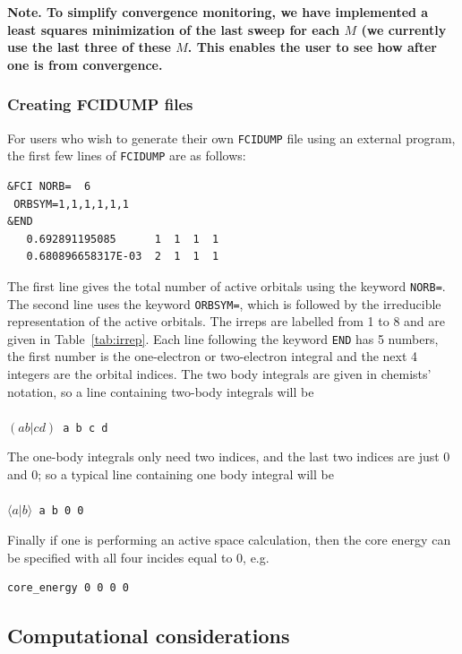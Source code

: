 \documentclass[letterpaper,12pt,aps, pra]{revtex4-1}
\begin{document}
{\bf Note.  To simplify convergence monitoring, we have implemented a least
squares minimization of the last sweep for each $M$ (we currently use the last
three of these $M$. This enables the user to see how after one is from
convergence.}

\subsubsection{Creating FCIDUMP files}\label{sec:appFCIDUMP}
For users who wish to generate their own \texttt{FCIDUMP} file using an external program, the first few lines of \texttt{FCIDUMP} are as follows:
\begin{verbatim}
&FCI NORB=  6
 ORBSYM=1,1,1,1,1,1
&END
   0.692891195085      1  1  1  1
   0.680896658317E-03  2  1  1  1
\end{verbatim}
The first line gives the total number of active orbitals using the keyword \texttt{NORB=}. The second line uses the keyword \texttt{ORBSYM=}, which is followed by the irreducible representation of the active orbitals. The irreps are labelled from 1 to 8 and are given in Table~\ref{tab:irrep}.
Each line following the keyword \texttt{END} has 5 numbers, the first number is the one-electron or two-electron integral and the next 4 integers are the orbital indices. The two body integrals are given in chemists' notation, so a line containing two-body integrals will be\\
\texttt{
\\$( a b|cd)$ a b c d\\}
 
The one-body integrals only need two indices, and the last two indices are just 0 and 0; so a typical line containing one body integral will be\\
\texttt{
\\$\langle a|b\rangle$ a b 0 0\\}

Finally if one is performing an active space calculation, then the core energy can be specified with all four incides equal to 0, e.g.
\begin{verbatim}
core_energy 0 0 0 0
\end{verbatim}

\subsection{Computational considerations}\label{sec:computation}
\end{document}
